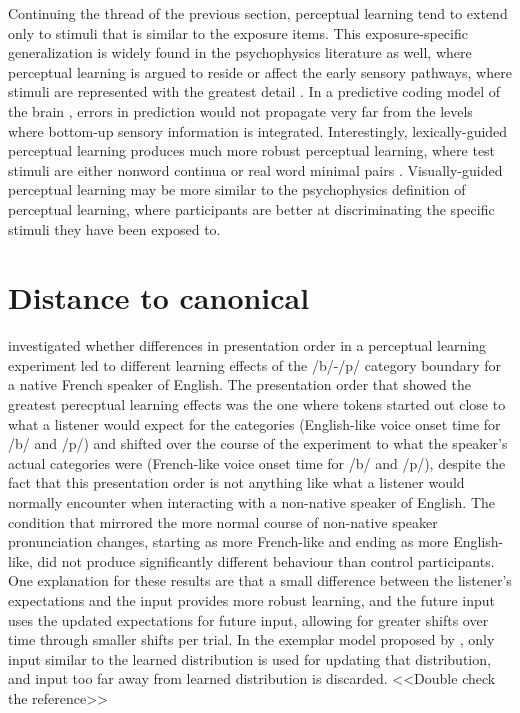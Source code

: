 Continuing the thread of the previous section, perceptual learning tend to extend only to stimuli that is similar to the exposure items.
This exposure-specific generalization is widely found in the psychophysics literature as well, where perceptual learning is argued to reside or affect the early sensory pathways, where stimuli are represented with the greatest detail \citep{Gilbert2001}.  
In a predictive coding model of the brain \citep{Clark2013}, errors in prediction would not propagate very far from the levels where bottom-up sensory information is integrated.  
Interestingly, lexically-guided perceptual learning produces much more robust perceptual learning, where test stimuli are either nonword continua \citep{Norris2003} or real word minimal pairs \citep{Reinisch2013}.  
Visually-guided perceptual learning may be more similar to the psychophysics definition of perceptual learning, where participants are better at discriminating the specific stimuli they have been exposed to.

\section{Distance to canonical}

%
\citet{Sumner2011} investigated whether differences in presentation order in a perceptual learning experiment led to different learning effects of the /b/-/p/ category boundary for a native French speaker of English.  
The presentation order that showed the greatest perecptual learning effects was the one where tokens started out close to what a listener would expect for the categories (English-like voice onset time for /b/ and /p/) and shifted over the course of the experiment to what the speaker's actual categories were (French-like voice onset time for /b/ and /p/), despite the fact that this presentation order is not anything like what a listener would normally encounter when interacting with a non-native speaker of English.  
The condition that mirrored the more normal course of non-native speaker pronunciation changes, starting as more French-like and ending as more English-like, did not produce significantly different behaviour than control participants.  
One explanation for these results are that a small difference between the listener's expectations and the input provides more robust learning, and the future input uses the updated expectations for future input, allowing for greater shifts over time through smaller shifts per trial.  
In the exemplar model proposed by \citet{Pierrehumbert2002}, only input similar to the learned distribution is used for updating that distribution, and input too far away from learned distribution is discarded. <<Double check the reference>>

